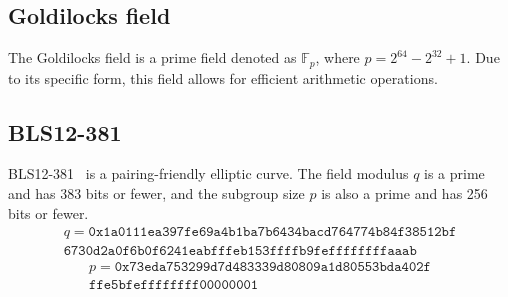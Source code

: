 \subsection{Goldilocks field}
\label{sec:goldilocks}
The Goldilocks field is a prime field denoted as $\mathbb{F}_p$, where $p=2^{64} - 2^{32} + 1$. Due to its specific form, this field allows for efficient arithmetic operations.

\subsection{BLS12-381}
\label{sec:bls12}
BLS12-381~\cite{cryptoeprint:2017/1050} is a pairing-friendly elliptic curve.
The field modulus $q$ is a prime and has 383 bits or fewer, and the subgroup size $p$ is also a prime and has 256 bits or fewer.
\[
\begin{split}
    q=\mathtt{0x1a0111ea397fe69a4b1ba7b6434bacd764774b84f38512bf} \\
    \mathtt{6730d2a0f6b0f6241eabfffeb153ffffb9feffffffffaaab}
\end{split}
\]
\[
\begin{split}
    p=\mathtt{0x73eda753299d7d483339d80809a1d80553bda402f}
    \\
    \mathtt{ffe5bfeffffffff00000001}
\end{split}
\]